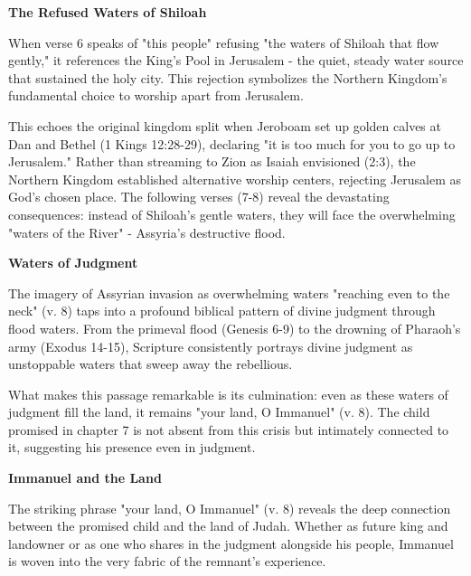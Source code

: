 \documentclass[11pt]{article}
\begin{document}
\vspace{3em}
{\large\bfseries The Refused Waters of Shiloah}
\vspace{1em}

When verse 6 speaks of "this people" refusing "the waters of Shiloah that flow gently," it references the King's Pool in Jerusalem - the quiet, steady water source that sustained the holy city. This rejection symbolizes the Northern Kingdom's fundamental choice to worship apart from Jerusalem.

\vspace{1em}
This echoes the original kingdom split when Jeroboam set up golden calves at Dan and Bethel (1 Kings 12:28-29), declaring "it is too much for you to go up to Jerusalem." Rather than streaming to Zion as Isaiah envisioned (2:3), the Northern Kingdom established alternative worship centers, rejecting Jerusalem as God's chosen place. The following verses (7-8) reveal the devastating consequences: instead of Shiloah's gentle waters, they will face the overwhelming "waters of the River" - Assyria's destructive flood.

\vspace{3em}
{\large\bfseries Waters of Judgment}
\vspace{1em}

The imagery of Assyrian invasion as overwhelming waters "reaching even to the neck" (v. 8) taps into a profound biblical pattern of divine judgment through flood waters. From the primeval flood (Genesis 6-9) to the drowning of Pharaoh's army (Exodus 14-15), Scripture consistently portrays divine judgment as unstoppable waters that sweep away the rebellious.

\vspace{1em}
What makes this passage remarkable is its culmination: even as these waters of judgment fill the land, it remains "your land, O Immanuel" (v. 8). The child promised in chapter 7 is not absent from this crisis but intimately connected to it, suggesting his presence even in judgment.

\vspace{3em}
{\large\bfseries Immanuel and the Land}
\vspace{1em}

The striking phrase "your land, O Immanuel" (v. 8) reveals the deep connection between the promised child and the land of Judah. Whether as future king and landowner or as one who shares in the judgment alongside his people, Immanuel is woven into the very fabric of the remnant's experience.
\end{document}
